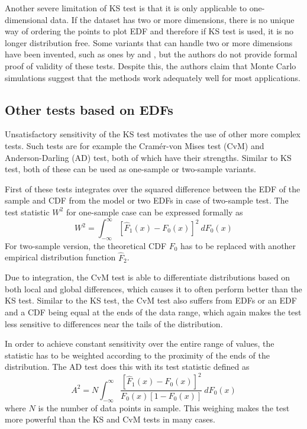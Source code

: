 \documentclass[english, oneside]{HYgradu}
\begin{document}
Another severe limitation of KS test is that it is only applicable to one-dimensional data. If the dataset has two or more dimensions, there is no unique way of ordering the points to plot EDF and therefore if KS test is used, it is no longer distribution free. Some variants that can handle two or more dimensions have been invented, such as ones by \citet{peacock1983twodimensional} and \citet{fasano1987multidimensional}, but the authors do not provide formal proof of validity of these tests. Despite this, the authors claim that Monte Carlo simulations suggest that the methods work adequately well for most applications.



\subsection{Other tests based on EDFs}
\reversemarginpar
{}
Unsatisfactory sensitivity of the KS test motivates the use of other more complex tests. Such tests are for example the Cram\'er-von Mises test (CvM) and Anderson-Darling (AD) test, both of which have their strengths. Similar to KS test, both of these can be used as one-sample or two-sample variants.  

First of these tests integrates over the squared difference between the EDF of the sample and CDF from the model or two EDFs in case of two-sample test. The test statistic $W^2$ for one-sample case can be expressed formally as
\begin{equation}
	W^2 = \int_{-\infty}^{\infty}[\hat F_1(x) - F_0(x)]^2\ dF_0(x)
\end{equation}
For two-sample version, the theoretical CDF $F_0$ has to be replaced with another empirical distribution function $\hat F_2$.

Due to integration, the CvM test is able to differentiate distributions based on both local and global differences, which causes it to often perform better than the KS test. Similar to the KS test, the CvM test also suffers from EDFs or an EDF and a CDF being equal at the ends of the data range, which again makes the test less sensitive to differences near the tails of the distribution. 

In order to achieve constant sensitivity over the entire range of values, the statistic has to be weighted according to the proximity of the ends of the distribution. The AD test does this with its test statistic defined as
\begin{equation}
	A^2 = N \int_{-\infty}^{\infty} \frac{[\hat F_1(x) - F_0(x)]^2}{F_0(x)[1-F_0(x)]}\ dF_0(x)
\end{equation}
where $N$ is the number of data points in sample. This weighing makes the test more powerful than the KS and CvM tests in many cases. \citep{bohm2010introduction, feigelson2012modern}
\end{document}
